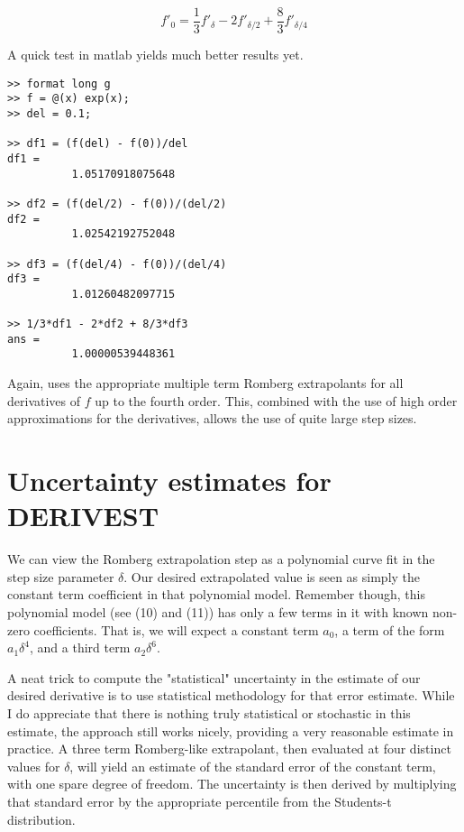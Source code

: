 \documentclass[a4paper,11pt]{article}
\begin{document}
\begin{equation} \tag{14}
   f'_0 = \frac{1}{3}f'_\delta - 2f'_{\delta/2} + \frac{8}{3}f'_{\delta/4}
\end{equation}

A quick test in matlab yields much better results yet.

\begin{lstlisting}
>> format long g
>> f = @(x) exp(x);
>> del = 0.1;

>> df1 = (f(del) - f(0))/del
df1 =
          1.05170918075648

>> df2 = (f(del/2) - f(0))/(del/2)
df2 =
          1.02542192752048

>> df3 = (f(del/4) - f(0))/(del/4)
df3 =
          1.01260482097715

>> 1/3*df1 - 2*df2 + 8/3*df3
ans =
          1.00000539448361
\end{lstlisting}          

Again,  uses the appropriate multiple term Romberg extrapolants for all derivatives
of $f$ up to the fourth order. This, combined with the use of high order approximations for the derivatives, allows the use of quite large step sizes.

\bigskip

\section{Uncertainty estimates for DERIVEST}

We can view the Romberg extrapolation step as a polynomial curve fit in the step size parameter
$\delta$. Our desired extrapolated value is seen as simply the constant term coefficient in that polynomial model. Remember though, this polynomial model (see (10) and (11)) has only a few
terms in it with known non-zero coefficients. That is, we will expect a constant term $a_0$, a term
of the form $a_1 \delta^4$, and a third term $a_2 \delta^6$. 

A neat trick to compute the "statistical" uncertainty in the estimate of our desired derivative is to
use statistical methodology for that error estimate. While I do appreciate that there is nothing
truly statistical or stochastic in this estimate, the approach still works nicely, providing a very reasonable estimate in practice. A three term Romberg-like extrapolant, then evaluated at four distinct values for $\delta$, will yield an estimate of the standard error of the constant term, with one spare degree of freedom. The uncertainty is then derived by multiplying that standard error by the appropriate percentile from the Students-t distribution.
\end{document}
